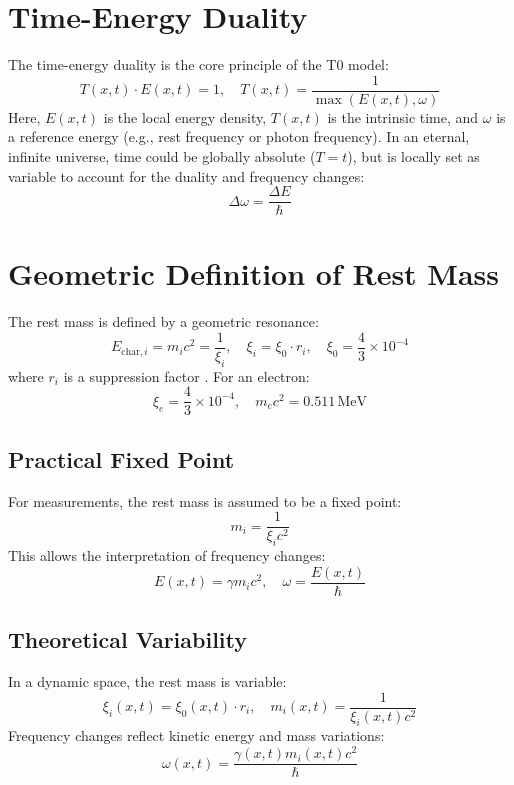 \documentclass[12pt,a4paper]{article}
\begin{document}
	\section{Time-Energy Duality}
	The time-energy duality is the core principle of the T0 model:
	\begin{equation}
		T(x,t) \cdot E(x,t) = 1, \quad T(x,t) = \frac{1}{\max(E(x,t), \omega)}
	\end{equation}
	Here, \(E(x,t)\) is the local energy density, \(T(x,t)\) is the intrinsic time, and \(\omega\) is a reference energy (e.g., rest frequency or photon frequency). In an eternal, infinite universe, time could be globally absolute (\( T = t \)), but is locally set as variable to account for the duality and frequency changes:
	\begin{equation}
		\Delta \omega = \frac{\Delta E}{\hbar}
	\end{equation}
	
	\section{Geometric Definition of Rest Mass}
	The rest mass is defined by a geometric resonance:
	\begin{equation}
		E_{\text{char},i} = m_i c^2 = \frac{1}{\xi_i}, \quad \xi_i = \xi_0 \cdot r_i, \quad \xi_0 = \frac{4}{3} \times 10^{-4}
	\end{equation}
	where \(r_i\) is a suppression factor \cite{pascher_t0_energie_2025}. For an electron:
	\begin{equation}
		\xi_e = \frac{4}{3} \times 10^{-4}, \quad m_e c^2 = 0.511 \, \text{MeV}
	\end{equation}
	
	\subsection{Practical Fixed Point}
	For measurements, the rest mass is assumed to be a fixed point:
	\begin{equation}
		m_i = \frac{1}{\xi_i c^2}
	\end{equation}
	This allows the interpretation of frequency changes:
	\begin{equation}
		E(x,t) = \gamma m_i c^2, \quad \omega = \frac{E(x,t)}{\hbar}
	\end{equation}
	
	\subsection{Theoretical Variability}
	In a dynamic space, the rest mass is variable:
	\begin{equation}
		\xi_i(x,t) = \xi_0(x,t) \cdot r_i, \quad m_i(x,t) = \frac{1}{\xi_i(x,t) c^2}
	\end{equation}
	Frequency changes reflect kinetic energy and mass variations:
	\begin{equation}
		\omega(x,t) = \frac{\gamma(x,t) m_i(x,t) c^2}{\hbar}
	\end{equation}
	
\end{document}
